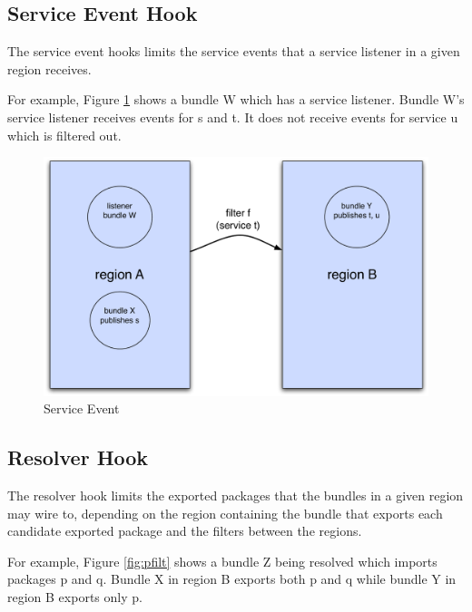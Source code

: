 \documentclass[a4paper,9pt]{article}
\begin{document}
\subsection{Service Event Hook}

The service event hooks limits the service events that a service listener in a given region receives.

For example, Figure \ref{fig:sevent} shows a bundle W which has a service listener.
Bundle W's service listener receives events for s and t. It does not receive events for service u which is filtered out. 
\begin{figure}[h!]
\begin{center}
\includegraphics*[scale=0.4]{service-event.pdf}
\caption{Service Event \label{fig:sevent}}
\end{center}
\end{figure}

\subsection{Resolver Hook}

The resolver hook limits the exported packages that the bundles in a given region may wire to, depending on
the region containing the bundle that exports each candidate exported package and the filters between the
regions.

For example, Figure \ref{fig:pfilt} shows a bundle Z being resolved which imports packages p and q. Bundle X
in region B exports both p and q while bundle Y in region B exports only p.
\end{document}
